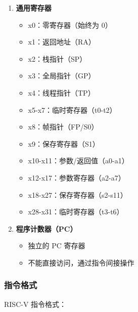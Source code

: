 \begin{enumerate}
  \item \textbf{通用寄存器}
    \begin{itemize}
      \item x0：零寄存器（始终为 0）
      \item x1：返回地址（RA）
      \item x2：栈指针（SP）
      \item x3：全局指针（GP）
      \item x4：线程指针（TP）
      \item x5-x7：临时寄存器（t0-t2）
      \item x8：帧指针（FP/S0）
      \item x9：保存寄存器（S1）
      \item x10-x11：参数/返回值（a0-a1）
      \item x12-x17：参数寄存器（a2-a7）
      \item x18-x27：保存寄存器（s2-s11）
      \item x28-x31：临时寄存器（t3-t6）
    \end{itemize}

  \item \textbf{程序计数器（PC）}
    \begin{itemize}
      \item 独立的 PC 寄存器
      \item 不能直接访问，通过指令间接操作
    \end{itemize}
\end{enumerate}

\subsubsection{指令格式}

RISC-V 指令格式：

